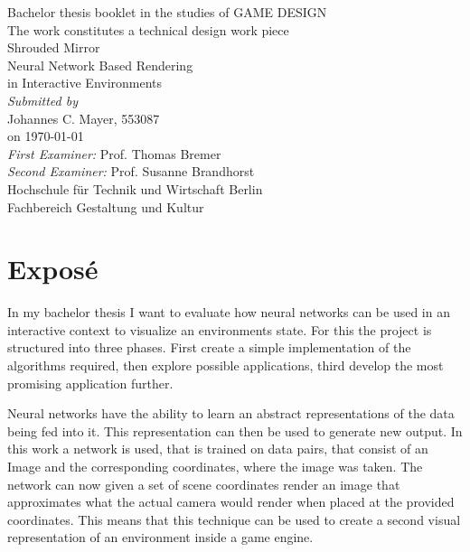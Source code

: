 \documentclass[a4paper, twoside, 10pt]{report}
\begin{document}
\begin{flushleft}
\begin{spacing}{1.5}
{\large
Bachelor thesis booklet in the studies of GAME DESIGN \\
The work constitutes a technical design work piece \\
\vspace*{\fill}
{\Huge Shrouded Mirror} \\
{\Large Neural Network Based Rendering \\ in Interactive Environments \\}
\vspace*{\fill}
\textit{Submitted by} \\
Johannes C. Mayer, 553087 \\
on \today \\
\vspace*{1cm}
\textit{First Examiner:} Prof. Thomas Bremer \\
\textit{Second Examiner:} Prof. Susanne Brandhorst \\
\vspace*{1cm}
Hochschule f\"ur Technik und Wirtschaft Berlin \\
Fachbereich Gestaltung und Kultur \\
}
\end{spacing}
\end{flushleft}

\chapter*{Expos\'e}
In my bachelor thesis I want to evaluate how neural networks can be used in an interactive context to visualize an environments state. For this the project is structured into three phases. First create a simple implementation of the algorithms required, then explore possible applications, third develop the most promising application further.

Neural networks have the ability to learn an abstract representations of the data being fed into it. This representation can then be used to generate new output. In this work a network is used, that is trained on data pairs, that consist of an Image and the corresponding coordinates, where the image was taken.  The network can now given a set of scene coordinates render an image that approximates what the actual camera would render when placed at the provided coordinates. This means that this technique can be used to create a second visual representation of an environment inside a game engine. 
\end{document}
